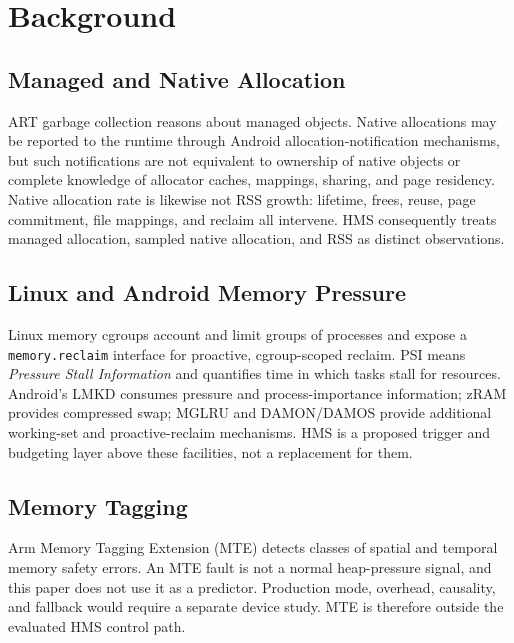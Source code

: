 \section{Background}
\subsection{Managed and Native Allocation}
ART garbage collection reasons about managed objects.  Native allocations may be
reported to the runtime through Android allocation-notification mechanisms, but
such notifications are not equivalent to ownership of native objects or complete
knowledge of allocator caches, mappings, sharing, and page residency.  Native
allocation rate is likewise not RSS growth: lifetime, frees, reuse, page
commitment, file mappings, and reclaim all intervene.  HMS consequently treats
managed allocation, sampled native allocation, and RSS as distinct observations.

\subsection{Linux and Android Memory Pressure}
Linux memory cgroups account and limit groups of processes and expose a
\texttt{memory.reclaim} interface for proactive, cgroup-scoped reclaim.  PSI means
\emph{Pressure Stall Information} and quantifies time in which tasks stall for
resources.  Android's LMKD consumes pressure and process-importance information;
zRAM provides compressed swap; MGLRU and DAMON/DAMOS provide additional
working-set and proactive-reclaim mechanisms.  HMS is a proposed trigger and
budgeting layer above these facilities, not a replacement for them.

\subsection{Memory Tagging}
Arm Memory Tagging Extension (MTE) detects classes of spatial and temporal memory
safety errors.  An MTE fault is not a normal heap-pressure signal, and this paper
does not use it as a predictor.  Production mode, overhead, causality, and fallback
would require a separate device study.  MTE is therefore outside the evaluated HMS
control path.
